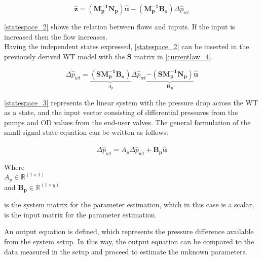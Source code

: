 \begin{equation}
 \bm{\hat{z}} = (\bm{M_p^{-1}}\bm{N_p})\bm{\hat{u}} - (\bm{M_p^{-1}}\bm{B_o})\Delta \hat{p}_{wt}    
 \label{statespace_2}
\end{equation}

\eqref{statespace_2} shows the relation between flows and inputs. If the input is increased then the flow increases. 
\\
Having the independent states expressed, \eqref{statespace_2} can be inserted in the previously derived WT model with the $\bm{S}$ matrix in \eqref{currentlaw_4}. 

\begin{equation}
\Delta \dot{\hat{p}}_{wt} =  \underbrace{(\bm{S}\bm{M_p^{-1}}\bm{B_o})}_\text{$A_p$} \Delta \hat{p}_{wt}   \underbrace{-(\bm{S}\bm{M_p^{-1}}\bm{N_p})}_\text{$\bm{B_p}$} \bm{\hat{u}} 
\label{statespace_3}
\end{equation}

\eqref{statespace_3} represents the linear system with the pressure drop across the WT as a state, and the input vector consisting of differential pressures from the pumps and OD values from the end-user valves. The general formulation of the small-signal state equation can be written as follows:  

\begin{equation}
\Delta \dot{\hat{p}}_{wt} =  A_p \Delta \hat{p}_{wt}  + \bm{B_p}\bm{\hat{u}}  
 \label{statespace_4}
\end{equation}

\begin{minipage}[t]{0.24\textwidth}
Where\\
\hspace*{8mm} $A_p \in \mathbb{R}^{(1 \times 1)} $ \\
\newline
and \hspace*{0.7mm} $\bm{B_p} \in \bm{\mathbb{R}}^{(1 \times g)} $ 
\end{minipage}
\begin{minipage}[t]{0.74\textwidth}
\vspace*{2mm}
is the system matrix for the parameter estimation, which in this case is a scalar, \\
is the input matrix for the parameter estimation.
\end{minipage} 

An output equation is defined, which represents the pressure difference available from the system setup. In this way, the output equation can be compared 
to the data measured in the setup and proceed to estimate the unknown parameters. 

